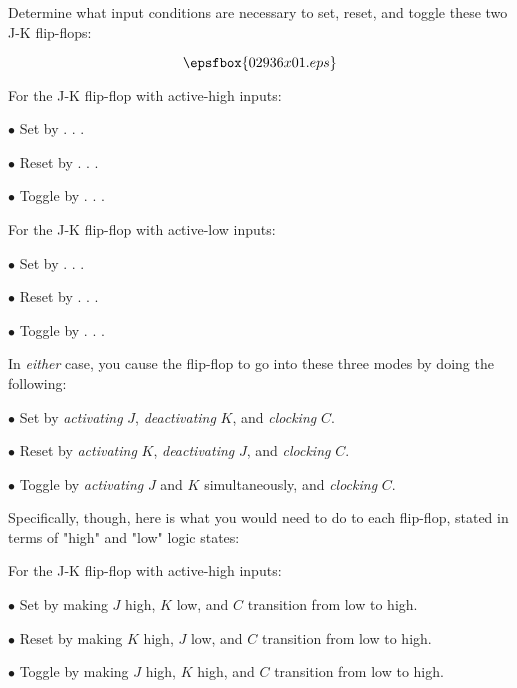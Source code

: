 

Determine what input conditions are necessary to set, reset, and toggle these two J-K flip-flops:

$$\epsfbox{02936x01.eps}$$

\vskip 10pt

For the J-K flip-flop with active-high inputs:

\medskip
\item{$\bullet$} Set by . . .
\item{$\bullet$} Reset by . . .
\item{$\bullet$} Toggle by . . .
\medskip

\vskip 10pt

For the J-K flip-flop with active-low inputs:

\medskip
\item{$\bullet$} Set by . . .
\item{$\bullet$} Reset by . . .
\item{$\bullet$} Toggle by . . .
\medskip







In {\it either} case, you cause the flip-flop to go into these three modes by doing the following:

\medskip
\item{$\bullet$} Set by {\it activating} $J$, {\it deactivating} $K$, and {\it clocking} $C$.
\item{$\bullet$} Reset by {\it activating} $K$, {\it deactivating} $J$, and {\it clocking} $C$.
\item{$\bullet$} Toggle by {\it activating} $J$ and $K$ simultaneously, and {\it clocking} $C$.
\medskip

Specifically, though, here is what you would need to do to each flip-flop, stated in terms of "high" and "low" logic states:

\vskip 10pt

For the J-K flip-flop with active-high inputs:

\medskip
\item{$\bullet$} Set by making $J$ high, $K$ low, and $C$ transition from low to high.
\item{$\bullet$} Reset by making $K$ high, $J$ low, and $C$ transition from low to high.
\item{$\bullet$} Toggle by making $J$ high, $K$ high, and $C$ transition from low to high.
\medskip

